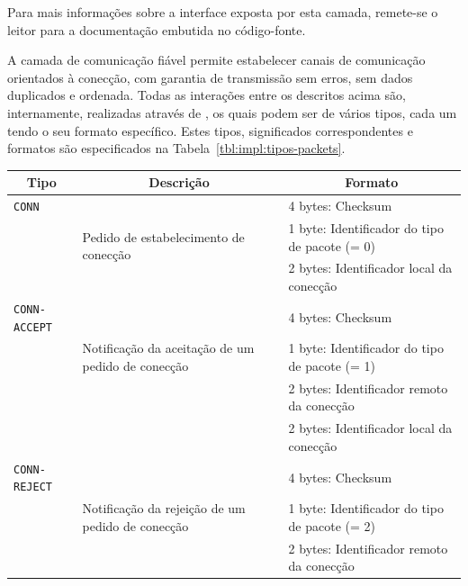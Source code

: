 Para mais informações sobre a interface exposta por esta camada, remete-se o leitor para a documentação  embutida no código-fonte.


A camada de comunicação fiável permite estabelecer canais  de comunicação orientados à conecção, com garantia de transmissão sem erros, sem dados duplicados e ordenada. Todas as interações entre os  descritos acima são, internamente, realizadas através de , os quais podem ser de vários tipos, cada um tendo o seu formato específico. Estes tipos, significados correspondentes e formatos são especificados na Tabela~\ref{tbl:impl:tipos-packets}.

\begin{table}[ht]
  \centering
  \setlength{\tabcolsep}{6.5pt}
  \renewcommand{\arraystretch}{1.3}
  \begin{tabularx}{\textwidth}{|l|X|l|}
  
    \hline
    \multicolumn{1}{|c|}{\textbf{Tipo}} &
    \multicolumn{1}{c|}{\textbf{Descrição}} &
    \multicolumn{1}{c|}{\textbf{Formato}}
    \\ \hline
    
    \texttt{CONN}
     & \multirow[t]{3}{=}{Pedido de estabelecimento de conecção}
       & 4 bytes: Checksum \\
     & & 1 byte: Identificador do tipo de pacote (= 0) \\
     & & 2 bytes: Identificador local da conecção \\
    \hline
    
    \texttt{CONN-ACCEPT}
     & \multirow[t]{3}{=}{Notificação da aceitação de um pedido de conecção}
       & 4 bytes: Checksum \\
     & & 1 byte: Identificador do tipo de pacote (= 1) \\
     & & 2 bytes: Identificador remoto da conecção \\
     & & 2 bytes: Identificador local da conecção \\
    \hline

    \texttt{CONN-REJECT}
     & \multirow[t]{3}{=}{Notificação da rejeição de um pedido de conecção}
       & 4 bytes: Checksum \\
     & & 1 byte: Identificador do tipo de pacote (= 2) \\
     & & 2 bytes: Identificador remoto da conecção \\
    \hline
    

\end{tabularx}
\end{table}

